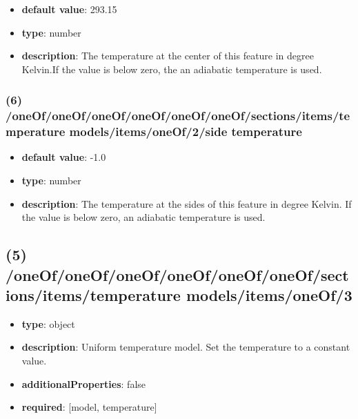 \begin{itemize}[leftmargin=6em]\item {\bf default value}: 293.15
\item {\bf type}: number
\item {\bf description}: The temperature at the center of this feature in degree Kelvin.If the value is below zero, the an adiabatic temperature is used.
\end{itemize}\subsubsection{(6) /oneOf/oneOf/oneOf/oneOf/oneOf/oneOf/sections/items/temperature models/items/oneOf/2/side temperature}
\begin{itemize}[leftmargin=6em]\item {\bf default value}: -1.0
\item {\bf type}: number
\item {\bf description}: The temperature at the sides of this feature in degree Kelvin. If the value is below zero, an adiabatic temperature is used.
\end{itemize}\subsection{(5) /oneOf/oneOf/oneOf/oneOf/oneOf/oneOf/sections/items/temperature models/items/oneOf/3}
\begin{itemize}[leftmargin=5em]\item {\bf type}: object
\item {\bf description}: Uniform temperature model. Set the temperature to a constant value.
\item {\bf additionalProperties}: false
\item {\bf required}: [model, temperature]\end{itemize}
